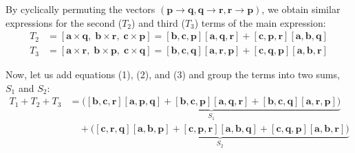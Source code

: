 \documentclass[12pt,a4paper]{article}
\begin{document}
\begin{enumerate}
\begin{tcolorbox}[enhanced,breakable,ansbox,colback=cD!4,colframe=cD,boxrule=0.8pt,arc=5pt,title={\textbf{Answer}},fonttitle=\bfseries\color{white},colbacktitle=cD]
By cyclically permuting the vectors $(\mathbf{p} \to \mathbf{q}, \mathbf{q} \to \mathbf{r}, \mathbf{r} \to \mathbf{p})$, we obtain similar expressions for the second ($T_2$) and third ($T_3$) terms of the main expression:
\begin{align}
    T_2 &= [\mathbf{a}\times\mathbf{q},\;\mathbf{b}\times\mathbf{r},\;\mathbf{c}\times\mathbf{p}] = [\mathbf{b}, \mathbf{c}, \mathbf{p}][\mathbf{a}, \mathbf{q}, \mathbf{r}] + [\mathbf{c}, \mathbf{p}, \mathbf{r}][\mathbf{a}, \mathbf{b}, \mathbf{q}] \\
    T_3 &= [\mathbf{a}\times\mathbf{r},\;\mathbf{b}\times\mathbf{p},\;\mathbf{c}\times\mathbf{q}] = [\mathbf{b}, \mathbf{c}, \mathbf{q}][\mathbf{a}, \mathbf{r}, \mathbf{p}] + [\mathbf{c}, \mathbf{q}, \mathbf{p}][\mathbf{a}, \mathbf{b}, \mathbf{r}]
\end{align}

Now, let us add equations (1), (2), and (3) and group the terms into two sums, $S_1$ and $S_2$:
\begin{align*}
    T_1 + T_2 + T_3 &= \underbrace{\big( [\mathbf{b}, \mathbf{c}, \mathbf{r}][\mathbf{a}, \mathbf{p}, \mathbf{q}] + [\mathbf{b}, \mathbf{c}, \mathbf{p}][\mathbf{a}, \mathbf{q}, \mathbf{r}] + [\mathbf{b}, \mathbf{c}, \mathbf{q}][\mathbf{a}, \mathbf{r}, \mathbf{p}] \big)}_{S_1} \\
    &\quad + \underbrace{\big( [\mathbf{c}, \mathbf{r}, \mathbf{q}][\mathbf{a}, \mathbf{b}, \mathbf{p}] + [\mathbf{c}, \mathbf{p}, \mathbf{r}][\mathbf{a}, \mathbf{b}, \mathbf{q}] + [\mathbf{c}, \mathbf{q}, \mathbf{p}][\mathbf{a}, \mathbf{b}, \mathbf{r}] \big)}_{S_2}
\end{align*}


\end{tcolorbox}
\end{enumerate}
\end{document}
